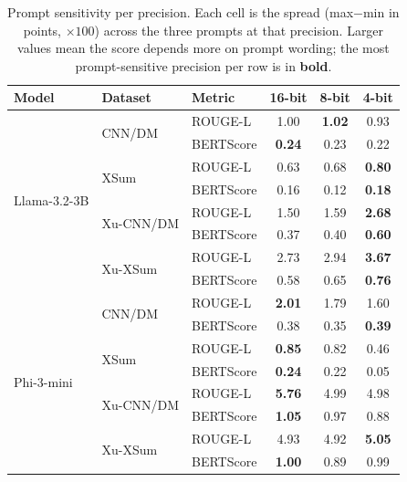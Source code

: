 \begin{table}[tbp]
\centering
\footnotesize
\setlength{\tabcolsep}{5pt}
\caption{Prompt sensitivity per precision. Each cell is the spread (max$-$min in points, $\times 100$) across the three prompts at that precision. Larger values mean the score depends more on prompt wording; the most prompt-sensitive precision per row is in \textbf{bold}.}
\label{tab:rq-spread}
\begin{tabular}{lllccc}
\toprule
\textbf{Model} & \textbf{Dataset} & \textbf{Metric} & \textbf{16-bit} & \textbf{8-bit} & \textbf{4-bit} \\
\midrule
\multirow{8}{*}{Llama-3.2-3B} & \multirow{2}{*}{CNN/DM} & ROUGE-L & 1.00 & \textbf{1.02} & 0.93 \\
 &  & BERTScore & \textbf{0.24} & 0.23 & 0.22 \\
\cmidrule(lr){2-6}
 & \multirow{2}{*}{XSum} & ROUGE-L & 0.63 & 0.68 & \textbf{0.80} \\
 &  & BERTScore & 0.16 & 0.12 & \textbf{0.18} \\
\cmidrule(lr){2-6}
 & \multirow{2}{*}{Xu-CNN/DM} & ROUGE-L & 1.50 & 1.59 & \textbf{2.68} \\
 &  & BERTScore & 0.37 & 0.40 & \textbf{0.60} \\
\cmidrule(lr){2-6}
 & \multirow{2}{*}{Xu-XSum} & ROUGE-L & 2.73 & 2.94 & \textbf{3.67} \\
 &  & BERTScore & 0.58 & 0.65 & \textbf{0.76} \\
\midrule
\multirow{8}{*}{Phi-3-mini} & \multirow{2}{*}{CNN/DM} & ROUGE-L & \textbf{2.01} & 1.79 & 1.60 \\
 &  & BERTScore & 0.38 & 0.35 & \textbf{0.39} \\
\cmidrule(lr){2-6}
 & \multirow{2}{*}{XSum} & ROUGE-L & \textbf{0.85} & 0.82 & 0.46 \\
 &  & BERTScore & \textbf{0.24} & 0.22 & 0.05 \\
\cmidrule(lr){2-6}
 & \multirow{2}{*}{Xu-CNN/DM} & ROUGE-L & \textbf{5.76} & 4.99 & 4.98 \\
 &  & BERTScore & \textbf{1.05} & 0.97 & 0.88 \\
\cmidrule(lr){2-6}
 & \multirow{2}{*}{Xu-XSum} & ROUGE-L & 4.93 & 4.92 & \textbf{5.05} \\
 &  & BERTScore & \textbf{1.00} & 0.89 & 0.99 \\
\bottomrule
\end{tabular}
\end{table}